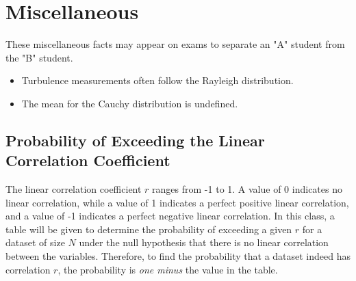 \section{Miscellaneous}

These miscellaneous facts may appear on exams to separate an "A" student from the "B" student.

\begin{itemize}
    \item Turbulence measurements often follow the Rayleigh distribution.
    \item The mean for the Cauchy distribution is undefined.
\end{itemize}

\subsection{Probability of Exceeding the Linear Correlation Coefficient}

The linear correlation coefficient $r$ ranges from -1 to 1. A value of 0 indicates no linear correlation, while a value of 1 indicates a perfect positive linear correlation, and a value of -1 indicates a perfect negative linear correlation. In this class, a table will be given to determine the probability of exceeding a given $r$ for a dataset of size $N$ under the null hypothesis that there is no linear correlation between the variables. Therefore, to find the probability that a dataset indeed has correlation $r$, the probability is \emph{one minus} the value in the table.